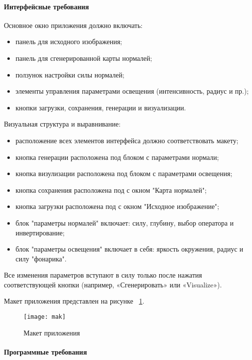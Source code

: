 \paragraph{Интерфейсные требования}

Основное окно приложения должно включать:
\begin{itemize}
	\item панель для исходного изображения;
	\item панель для сгенерированной карты нормалей;
	\item ползунок настройки силы нормалей;
	\item элементы управления параметрами освещения (интенсивность, радиус и пр.);
	\item кнопки загрузки, сохранения, генерации и визуализации.
\end{itemize}

Визуальная структура и выравнивание:
\begin{itemize}
	\item расположение всех элементов интерфейса должно соответствовать макету;
	\item кнопка генерации расположена под блоком с параметрами нормали;
	\item кнопка визулизации расположена под блоком с параметрами освещения;
	\item кнопка сохранения расположена под с окном "Карта нормалей";
	\item кнопка загрузки расположена под с окном "Исходное изображение";
	\item блок "параметры нормалей" включает: силу, глубину, выбор оператора и инвертирование;
	\item блок "параметры освещения" включает в себя: яркость окружения, радиус и силу "фонарика".
\end{itemize}

Все изменения параметров вступают в силу только после нажатия соответствующей кнопки (например, «Сгенерировать» или «Visualize»).

Макет приложения представлен на рисунке ~\ref{mak:image}.

\begin{figure}[ht]
	\texttt{[image: mak]}
	\caption{Макет приложения}
	\label{mak:image}
\end{figure}
\paragraph{Программные требования}

